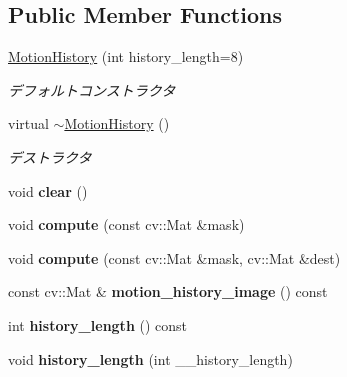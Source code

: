 \subsection*{Public Member Functions}
\begin{DoxyCompactItemize}
\item 
\hypertarget{classskl_1_1_motion_history_ac6a775109ea17ab2faef96b81fb6af7f}{}\label{classskl_1_1_motion_history_ac6a775109ea17ab2faef96b81fb6af7f} 
\hyperlink{classskl_1_1_motion_history_ac6a775109ea17ab2faef96b81fb6af7f}{Motion\+History} (int history\+\_\+length=8)
\begin{DoxyCompactList}\small\item\em デフォルトコンストラクタ \end{DoxyCompactList}\item 
\hypertarget{classskl_1_1_motion_history_a96663c59d447b957a2119b88d19ba3ef}{}\label{classskl_1_1_motion_history_a96663c59d447b957a2119b88d19ba3ef} 
virtual \hyperlink{classskl_1_1_motion_history_a96663c59d447b957a2119b88d19ba3ef}{$\sim$\+Motion\+History} ()
\begin{DoxyCompactList}\small\item\em デストラクタ \end{DoxyCompactList}\item 
\hypertarget{classskl_1_1_motion_history_a989d3ca9c62b0e2f54049e2c80d9b812}{}\label{classskl_1_1_motion_history_a989d3ca9c62b0e2f54049e2c80d9b812} 
void {\bfseries clear} ()
\item 
\hypertarget{classskl_1_1_motion_history_a1b4139e0548de8186a6d8ff5eb12ad2a}{}\label{classskl_1_1_motion_history_a1b4139e0548de8186a6d8ff5eb12ad2a} 
void {\bfseries compute} (const cv\+::\+Mat \&mask)
\item 
\hypertarget{classskl_1_1_motion_history_af4e461272b6055e96a7577f320ae1c4b}{}\label{classskl_1_1_motion_history_af4e461272b6055e96a7577f320ae1c4b} 
void {\bfseries compute} (const cv\+::\+Mat \&mask, cv\+::\+Mat \&dest)
\item 
\hypertarget{classskl_1_1_motion_history_a4f9e603fbd0b3f7eaf31b5dd6dbbf692}{}\label{classskl_1_1_motion_history_a4f9e603fbd0b3f7eaf31b5dd6dbbf692} 
const cv\+::\+Mat \& {\bfseries motion\+\_\+history\+\_\+image} () const
\item 
\hypertarget{classskl_1_1_motion_history_a5fb7cb9051242af9a3c23515332c6733}{}\label{classskl_1_1_motion_history_a5fb7cb9051242af9a3c23515332c6733} 
int {\bfseries history\+\_\+length} () const
\item 
\hypertarget{classskl_1_1_motion_history_a034de06af6715ba26cd7f9dd90ceaf6d}{}\label{classskl_1_1_motion_history_a034de06af6715ba26cd7f9dd90ceaf6d} 
void {\bfseries history\+\_\+length} (int \+\_\+\+\_\+history\+\_\+length)
\end{DoxyCompactItemize}
